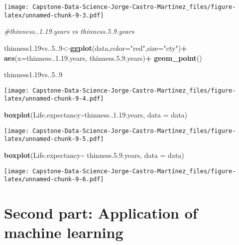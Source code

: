 \documentclass[
]{article}
\newenvironment{Shaded}{\begin{snugshade}}{\end{snugshade}}
\newcommand{\AttributeTok}[1]{\textcolor[rgb]{0.13,0.29,0.53}{#1}}
\newcommand{\CommentTok}[1]{\textcolor[rgb]{0.56,0.35,0.01}{\textit{#1}}}
\newcommand{\DecValTok}[1]{\textcolor[rgb]{0.00,0.00,0.81}{#1}}
\newcommand{\FloatTok}[1]{\textcolor[rgb]{0.00,0.00,0.81}{#1}}
\newcommand{\FunctionTok}[1]{\textcolor[rgb]{0.13,0.29,0.53}{\textbf{#1}}}
\newcommand{\NormalTok}[1]{#1}
\newcommand{\OtherTok}[1]{\textcolor[rgb]{0.56,0.35,0.01}{#1}}
\newcommand{\SpecialCharTok}[1]{\textcolor[rgb]{0.81,0.36,0.00}{\textbf{#1}}}
\newcommand{\StringTok}[1]{\textcolor[rgb]{0.31,0.60,0.02}{#1}}
\begin{document}
\texttt{[image: Capstone-Data-Science-Jorge-Castro-Martínez\_files/figure-latex/unnamed-chunk-9-3.pdf]}

\begin{Shaded}
\begin{Highlighting}[]
\CommentTok{\#thinness..1.19.years vs thinness.5.9.years}

\NormalTok{thinness1}\FloatTok{.19}\NormalTok{vs..}\DecValTok{5}\NormalTok{..}\DecValTok{9}\OtherTok{\textless{}{-}}\FunctionTok{ggplot}\NormalTok{(data,}\AttributeTok{color=}\StringTok{"red"}\NormalTok{,}\AttributeTok{size=}\StringTok{"cty"}\NormalTok{)}\SpecialCharTok{+}
  \FunctionTok{aes}\NormalTok{(}\AttributeTok{x=}\NormalTok{thinness..}\DecValTok{1}\NormalTok{.}\FloatTok{19.}\NormalTok{years, thinness.}\DecValTok{5}\NormalTok{.}\FloatTok{9.}\NormalTok{years)}\SpecialCharTok{+}
  \FunctionTok{geom\_point}\NormalTok{()}

\NormalTok{thinness1}\FloatTok{.19}\NormalTok{vs..}\DecValTok{5}\NormalTok{..}\DecValTok{9}
\end{Highlighting}
\end{Shaded}

\texttt{[image: Capstone-Data-Science-Jorge-Castro-Martínez\_files/figure-latex/unnamed-chunk-9-4.pdf]}

\begin{Shaded}
\begin{Highlighting}[]
\FunctionTok{boxplot}\NormalTok{(Life.expectancy}\SpecialCharTok{\textasciitilde{}}\NormalTok{thinness..}\DecValTok{1}\NormalTok{.}\FloatTok{19.}\NormalTok{years, }\AttributeTok{data =}\NormalTok{ data)}
\end{Highlighting}
\end{Shaded}

\texttt{[image: Capstone-Data-Science-Jorge-Castro-Martínez\_files/figure-latex/unnamed-chunk-9-5.pdf]}

\begin{Shaded}
\begin{Highlighting}[]
\FunctionTok{boxplot}\NormalTok{(Life.expectancy}\SpecialCharTok{\textasciitilde{}}\NormalTok{ thinness.}\DecValTok{5}\NormalTok{.}\FloatTok{9.}\NormalTok{years, }\AttributeTok{data =}\NormalTok{ data)}
\end{Highlighting}
\end{Shaded}

\texttt{[image: Capstone-Data-Science-Jorge-Castro-Martínez\_files/figure-latex/unnamed-chunk-9-6.pdf]}

\section{Second part: Application of machine
learning}\label{second-part-application-of-machine-learning}
\end{document}
